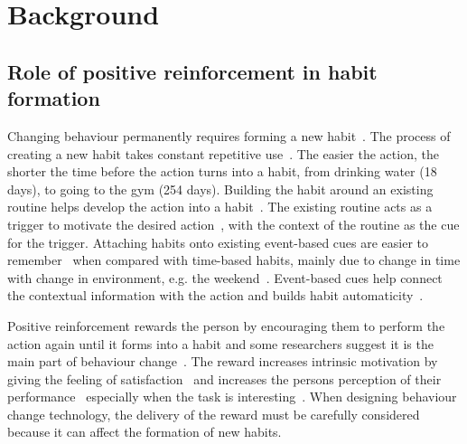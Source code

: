 \documentclass{scaffold/sigchi}
\begin{document}
\section{Background}
\subsection{Role of positive reinforcement in habit formation}
Changing behaviour permanently requires forming a new habit~\cite{article_experiences_of_habit_formation}. The process of creating a new habit takes constant repetitive use~\cite{article_how_habits_formed_modelling_habit_formation}. The easier the action, the shorter the time before the action turns into a habit, from drinking water (18 days), to going to the gym (254 days). Building the habit around an existing routine helps develop the action into a habit~\cite{habits_event_cues_1}. The existing routine acts as a trigger to motivate the desired action~\cite{habits_event_cues_2}, with the context of the routine as the cue for the trigger. Attaching habits onto existing event-based cues are easier to remember~\cite{article_implementation_intentions_multicue} when compared with time-based habits, mainly due to change in time with change in environment, e.g. the weekend~\cite{coaching_not_that_good}. Event-based cues help connect the contextual information with the action and builds habit automaticity~\cite{article_implementation_intentions}.

Positive reinforcement rewards the person by encouraging them to perform the action again until it forms into a habit and some researchers suggest it is the main part of behaviour change~\cite{article_a_self_efficacy}. The reward increases intrinsic motivation by giving the feeling of satisfaction~\cite{article_promoting_habit_formation} and increases the persons perception of their performance~\cite{positive_reinforcement_pro} especially when the task is interesting~\cite{article_meta_analytic_review_intrinsic_motivation}. When designing behaviour change technology, the delivery of the reward must be carefully considered because it can affect the formation of new habits.
\end{document}
